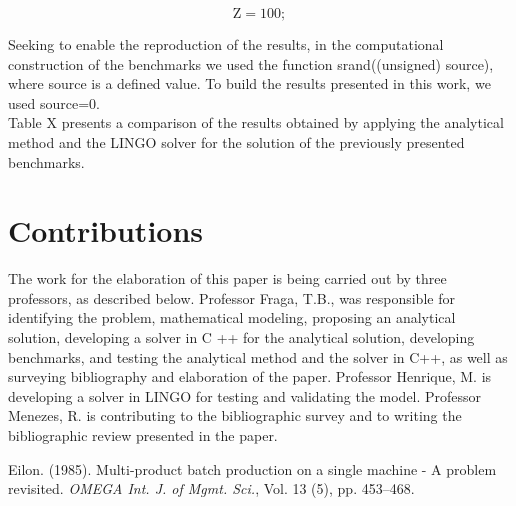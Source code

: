 \documentclass[preprint,12pt,authoryear]{elsarticle}
\begin{document}
\begin{equation}
\textrm{Z} = 100;
\end{equation}

Seeking to enable the reproduction of the results, in the computational construction of the benchmarks we used the function srand((unsigned) source), where source is a defined value. To build the results presented in this work, we used source=0. \\

Table X presents a comparison of the results obtained by applying the analytical method and the LINGO solver for the solution of the previously presented benchmarks.

\section{Contributions}

The work for the elaboration of this paper is being carried out by three professors, as described below. Professor Fraga, T.B., was responsible for identifying the problem, mathematical modeling, proposing an analytical solution, developing a solver in C ++ for the analytical solution, developing benchmarks, and testing the analytical method and the solver in C++, as well as surveying bibliography and elaboration of the paper. Professor Henrique, M.  is developing a solver in LINGO for testing and validating the model. Professor Menezes, R. is contributing to the bibliographic survey and to writing the bibliographic review presented in the paper.






\begin{thebibliography}{1}


Eilon. (1985). Multi-product batch production on a single machine - A problem revisited. {\it OMEGA Int. J. of Mgmt. Sci.}, Vol. 13 (5), pp. 453--468.

\end{thebibliography}
\end{document}
